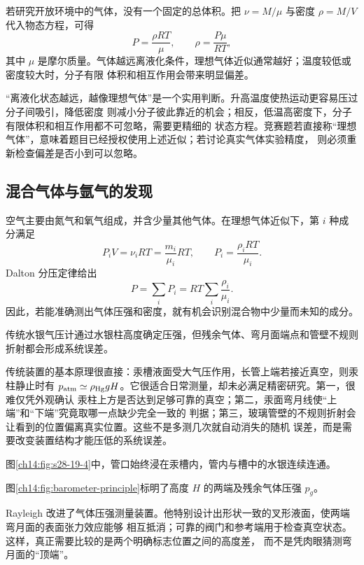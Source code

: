 若研究开放环境中的气体，没有一个固定的总体积。把 $\nu=M/\mu$ 与密度 $\rho=M/V$ 代入物态方程，可得
\begin{equation}
  \boxed{P=\frac{\rho RT}{\mu}},
  \qquad
  \boxed{\rho=\frac{P\mu}{RT}},
\end{equation}
其中 $\mu$ 是摩尔质量。气体越远离液化条件，理想气体近似通常越好；温度较低或密度较大时，分子有限
体积和相互作用会带来明显偏差。

“离液化状态越远，越像理想气体”是一个实用判断。升高温度使热运动更容易压过分子间吸引，降低密度
则减小分子彼此靠近的机会；相反，低温高密度下，分子有限体积和相互作用都不可忽略，需要更精细的
状态方程。竞赛题若直接称“理想气体”，意味着题目已经授权使用上述近似；若讨论真实气体实验精度，
则必须重新检查偏差是否小到可以忽略。

\subsection{混合气体与氩气的发现}\label{ch14:sec:mixtures}

空气主要由氮气和氧气组成，并含少量其他气体。在理想气体近似下，第 $i$ 种成分满足
\begin{equation}
  P_iV=\nu_iRT=\frac{m_i}{\mu_i}RT,
  \qquad
  P_i=\frac{\rho_iRT}{\mu_i}.
\end{equation}
Dalton 分压定律给出
\begin{equation}
  \boxed{P=\sum_iP_i=RT\sum_i\frac{\rho_i}{\mu_i}}.
\end{equation}
因此，若能准确测出气体压强和密度，就有机会识别混合物中少量而未知的成分。

传统水银气压计通过水银柱高度确定压强，但残余气体、弯月面端点和管壁不规则折射都会形成系统误差。

传统装置的基本原理很直接：汞槽液面受大气压作用，长管上端若接近真空，则汞柱静止时有
$p_{\rm atm}\simeq\rho_{\rm Hg}gH$。它很适合日常测量，却未必满足精密研究。第一，很难仅凭外观确认
汞柱上方是否达到足够可靠的真空；第二，汞面弯月线使“上端”和“下端”究竟取哪一点缺少完全一致的
判据；第三，玻璃管壁的不规则折射会让看到的位置偏离真实位置。这些不是多测几次就自动消失的随机
误差，而是需要改变装置结构才能压低的系统误差。

图\ref{ch14:fig:s28-19-4}中，管口始终浸在汞槽内，管内与槽中的水银连续连通。
\figureNineteenFourFaithful

图\ref{ch14:fig:barometer-principle}标明了高度 $H$ 的两端及残余气体压强 $p_g$。
\traditionalBarometerDiagram

Rayleigh 改进了气体压强测量装置。他特别设计出形状一致的叉形液面，使两端弯月面的表面张力效应能够
相互抵消；可靠的阀门和参考端用于检查真空状态。这样，真正需要比较的是两个明确标志位置之间的高度差，
而不是凭肉眼猜测弯月面的“顶端”。

